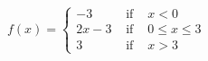 {${\displaystyle f(x) = \left\{ \begin{array}{rcl}  -3 & \mbox{ if } & x < 0 \\
                                                        2x-3 & \mbox{ if } & 0 \leq x \leq 3 \\
                                                            3 & \mbox{ if } & x > 3  
                                     \end{array} \right. }$}
{
\begin{center}
\end{center}
}